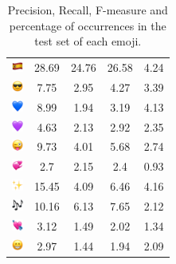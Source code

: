 \documentclass{article}
\begin{document}
\begin{table}
\begin{tabular}{|c|ccc|c|}
\includegraphics[height=0.37cm,width=0.37cm]{img/Spain.png} & 28.69 & 24.76 & 26.58 & 4.24\\ 
\includegraphics[height=0.37cm,width=0.37cm]{img/smiling_face_with_sunglasses.png} & 7.75 & 2.95 & 4.27 & 3.39\\ 
\includegraphics[height=0.37cm,width=0.37cm]{img/blue_heart.png} & 8.99 & 1.94 & 3.19 & 4.13\\ 
\includegraphics[height=0.37cm,width=0.37cm]{img/purple_heart.png} & 4.63 & 2.13 & 2.92 & 2.35\\ 
\includegraphics[height=0.37cm,width=0.37cm]{img/winking_face_with_tongue.png} & 9.73 & 4.01 & 5.68 & 2.74\\ 
\includegraphics[height=0.37cm,width=0.37cm]{img/revolving_hearts.png} & 2.7 & 2.15 & 2.4 & 0.93\\ 
\includegraphics[height=0.37cm,width=0.37cm]{img/sparkles.png} & 15.45 & 4.09 & 6.46 & 4.16\\ 
\includegraphics[height=0.37cm,width=0.37cm]{img/musical_notes.png} & 10.16 & 6.13 & 7.65 & 2.12\\ 
\includegraphics[height=0.37cm,width=0.37cm]{img/heart_with_arrow.png} & 3.12 & 1.49 & 2.02 & 1.34\\ 
\includegraphics[height=0.37cm,width=0.37cm]{img/beaming_face_with_smiling_eyes.png} & 2.97 & 1.44 & 1.94 & 2.09\\ 

\hline
\end{tabular}
\caption{\label{table:emoji_detailed} Precision, Recall, F-measure and percentage of occurrences in the test set of each emoji.}
\end{table}
\end{document}
